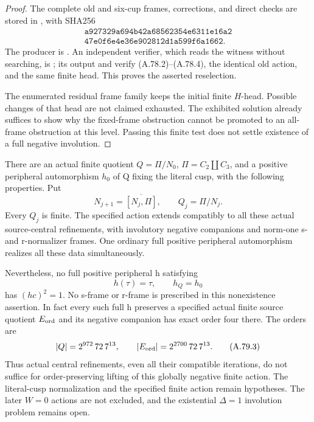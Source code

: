 \begin{proof}
The complete old and six-cup frames, corrections, and direct checks
are stored in
,
with SHA256
\[
\begin{gathered}
 \texttt{a927329a694b42a68562354e6311e16a2}\\
 \texttt{47e0f6e4e36e902812d1a599f6a1662}.
\end{gathered}
 \tag{A.78.5}
\]
The producer is
.
An independent verifier, which reads the witness without searching,
is
;
its output and
verify (A.78.2)--(A.78.4), the identical old action, and the same
finite head. This proves the asserted reselection.

The enumerated residual frame family keeps the initial finite
\(H\)-head. Possible changes of that head are not claimed
exhausted. The exhibited solution already suffices to show why
the fixed-frame obstruction cannot be promoted to an all-frame
obstruction at this level. Passing this finite test does not
settle existence of a full negative involution.
\end{proof}

There are an actual finite quotient \(Q=\Pi/N_0\),
\(\Pi=C_2\amalg C_3\), and a positive peripheral automorphism
\(h_0\) of Q fixing the literal cusp, with the following properties.
Put
\[
 N_{j+1}=\overline{[N_j,\Pi]},\qquad Q_j=\Pi/N_j.
 \tag{A.79.1}
\]
Every \(Q_j\) is finite. The specified action extends compatibly
to all these actual source-central refinements, with involutory
negative companions and norm-one s- and r-normalizer frames.
One ordinary full positive peripheral automorphism realizes all
these data simultaneously.

Nevertheless, no full positive peripheral h satisfying
\[
                  h(\tau)=\tau,\qquad h_Q=h_0
 \tag{A.79.2}
\]
has \((hc)^2=1\). No s-frame or r-frame is prescribed in this
nonexistence assertion. In fact every such full h preserves a
specified actual finite source quotient \(E_{\rm ord}\) and its
negative companion has exact order four there. The orders are
\[
 |Q|=2^{972}\,72\,7^{13},\qquad
 |E_{\rm ord}|=2^{2700}\,72\,7^{13}.
 \tag{A.79.3}
\]
Thus actual central refinements, even all their compatible
iterations, do not suffice for order-preserving lifting of this
globally negative finite action. The literal-cusp normalization
and the specified finite action remain hypotheses. The later
\(W=0\) actions are not excluded, and the existential
\(\Delta=1\) involution problem remains open.

